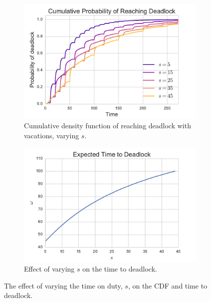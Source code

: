 \documentclass{article}
\begin{document}
\begin{figure}
\begin{center}
\begin{subfigure}[b]{0.45\textwidth}
    \includegraphics[width=\textwidth]{img/cdf_vary_s.pdf}
    \caption{Cumulative density function of reaching deadlock with vacations, varying $s$.}
    \label{fig:cdf_varys}
\end{subfigure}
\begin{subfigure}[b]{0.45\textwidth}
    \includegraphics[width=\textwidth]{img/ttd_vary_s.pdf}
    \caption{Effect of varying $s$ on the time to deadlock.}
    \label{fig:ttd_varys}
\end{subfigure}
\end{center}
\caption{The effect of varying the time on duty, $s$, on the CDF and time to deadlock.}
\label{fig:ttdcdf_varys}
\end{figure}
\end{document}

